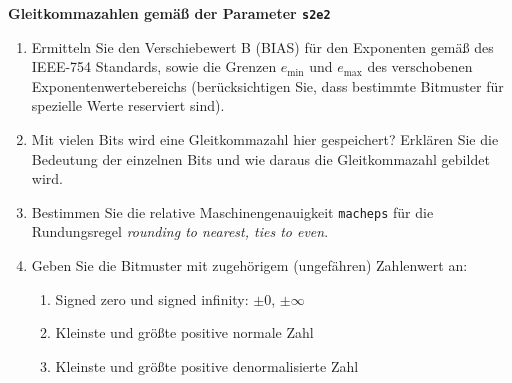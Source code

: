 	\textbf{Gleitkommazahlen gemäß der Parameter \texttt{s2e2}}
	\begin{enumerate}
		\item Ermitteln Sie den Verschiebewert B (BIAS) für den Exponenten gemäß des IEEE-754 Standards, sowie die Grenzen $e_{\text{min}}$ und $e_{\text{max}}$ des verschobenen Exponentenwertebereichs  (berücksichtigen Sie, dass bestimmte Bitmuster für spezielle Werte reserviert sind).
		\item Mit vielen Bits wird eine Gleitkommazahl hier gespeichert? Erklären Sie die Bedeutung der einzelnen Bits und wie daraus die Gleitkommazahl gebildet wird.
	\item Bestimmen Sie die relative Maschinengenauigkeit \texttt{macheps} für die Rundungsregel \textit{rounding to nearest, ties to even}.
\item Geben Sie die Bitmuster mit zugehörigem (ungefähren) Zahlenwert an:
\begin{enumerate}
	\item Signed zero und signed infinity:  $\pm 0$, $\pm \infty$
	\item Kleinste und größte positive normale Zahl
	\item Kleinste und größte positive denormalisierte Zahl
\end{enumerate}
	\end{enumerate}


